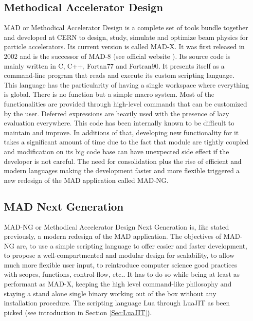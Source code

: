 

\subsection{Methodical Accelerator Design}
\label{Subsec:mad-orig}

MAD or Methodical Accelerator Design is a complete set of tools bundle together
and developed at CERN to design, study, simulate and optimize beam physics for
particle accelerators. Its current version is called MAD-X. It was first released
in 2002 and is the successor of  MAD-8 (see official website \cite{madx}).
Its source code is mainly written in C, C++, Fortan77 and Fortran90.
It presents itself as a command-line program that reads and execute its custom
scripting language. This language has the particularity of having a single
workspace where everything is global. There is no function but a simple macro
system. Most of the functionalities are provided through high-level commands that
can be customized by the user. Deferred expressions are heavily used with the
presence of lazy evaluation everywhere. This code has been internally known to
be difficult to maintain and improve. In additions of that, developing new
functionality for it takes a significant amount of time due to the fact that
module are tightly coupled and modification on its big code base can have
unexpected side effect if the developer is not careful. The need for
consolidation plus the rise of efficient and modern languages making the
development faster and more flexible triggered a new redesign of the MAD
application called MAD-NG.



\subsection{MAD Next Generation}
\label{Subsec:mad-ng}

MAD-NG or Methodical Accelerator Design Next Generation is, like stated previously,
a modern redesign of the MAD application. The objectives of MAD-NG are, to use
a simple scripting language to offer easier and faster development, to propose
a well-compartmented and modular design for scalability, to allow much more
flexible user input, to reintroduce computer science good practices with scopes,
functions, control-flow, etc.. It has to do so while being at least as performant
as MAD-X, keeping the high level command-like philosophy and staying a stand
alone single binary working out of the box without any installation procedure.
The scripting language Lua through LuaJIT as been picked (see introduction in
Section \ref{Sec:LuaJIT}).\\



